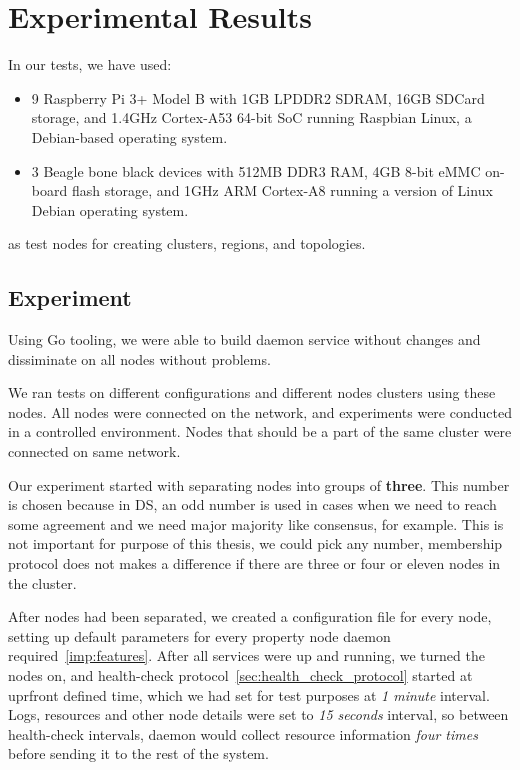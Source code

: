 \section{Experimental Results}\label{sec:results}
% 
In our tests, we have used:

\begin{itemize}
	\item 9 Raspberry Pi 3+ Model B with 1GB LPDDR2 SDRAM, 16GB SDCard storage, and 1.4GHz Cortex-A53 64-bit SoC running Raspbian Linux, a Debian-based operating system.
	\item 3 Beagle bone black devices with 512MB DDR3 RAM, 4GB 8-bit eMMC on-board flash storage, and 1GHz ARM Cortex-A8 running a version of Linux Debian operating system.
\end{itemize}

\noindent
as test nodes for creating clusters, regions, and topologies.
%
%
\subsection{Experiment}\label{sec:experiment}
%
Using Go tooling, we were able to build daemon service without changes and dissiminate on all nodes without problems.

We ran tests on different configurations and different nodes clusters using these nodes. All nodes were connected on the network, and experiments were conducted in a controlled environment. Nodes that should be a part of the same cluster were connected on same network.

Our experiment started with separating nodes into groups of \textbf{three}. This number is chosen because in DS, an odd number is used in cases when we need to reach some agreement and we need major majority like consensus, for example. This is not important for purpose of this thesis, we could pick any number, membership protocol does not makes a difference if there are three or four or eleven nodes in the cluster.

After nodes had been separated, we created a configuration file for every node, setting up default parameters for every property node daemon required~\ref{imp:features}. After all services were up and running, we turned the nodes on, and health-check protocol~\ref{sec:health_check_protocol} started at uprfront defined time, which we had set for test purposes at \emph{1 minute} interval. Logs, resources and other node details were set to \emph{15 seconds} interval, so between health-check intervals, daemon would collect resource information \emph{four times} before sending it to the rest of the system.

